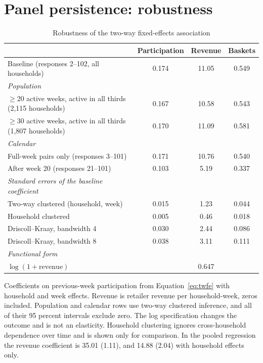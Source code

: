 \documentclass[11pt]{article}
\begin{document}
\clearpage
\appendix
\renewcommand{\thetable}{\thesection.\arabic{table}}
\renewcommand{\thefigure}{\thesection.\arabic{figure}}

\section{Panel persistence: robustness}
\label{app:panel}
\setcounter{table}{0}

\begin{table}[h]
\centering\small
\caption{Robustness of the two-way fixed-effects association}
\label{tab:panel-robust}
\begin{tabular}{@{}l S[table-format=1.3] S[table-format=2.3] S[table-format=1.3]@{}}
\toprule
 & {Participation} & {Revenue} & {Baskets} \\
\midrule
Baseline (responses 2--102, all households) & 0.174 & 11.05 & 0.549 \\
\addlinespace
\emph{Population} & & & \\
\quad $\ge$20 active weeks, active in all thirds (2,115 households) & 0.167 & 10.58 & 0.543 \\
\quad $\ge$30 active weeks, active in all thirds (1,807 households) & 0.170 & 11.09 & 0.581 \\
\addlinespace
\emph{Calendar} & & & \\
\quad Full-week pairs only (responses 3--101) & 0.171 & 10.76 & 0.540 \\
\quad After week 20 (responses 21--101) & 0.103 & 5.19 & 0.337 \\
\addlinespace
\emph{Standard errors of the baseline coefficient} & & & \\
\quad Two-way clustered (household, week) & 0.015 & 1.23 & 0.044 \\
\quad Household clustered & 0.005 & 0.46 & 0.018 \\
\quad Driscoll--Kraay, bandwidth 4 & 0.030 & 2.44 & 0.086 \\
\quad Driscoll--Kraay, bandwidth 8 & 0.038 & 3.11 & 0.111 \\
\addlinespace
\emph{Functional form} & & & \\
\quad $\log(1+\text{revenue})$ & & 0.647 & \\
\bottomrule
\end{tabular}

\smallskip
\parbox{0.94\textwidth}{\footnotesize Coefficients on previous-week participation from
Equation~\eqref{eq:twfe} with household and week effects. Revenue is retailer revenue per
household-week, zeros included. Population and calendar rows use two-way clustered inference, and all
of their 95 percent intervals exclude zero. The log specification changes the outcome and is not an
elasticity. Household clustering ignores cross-household dependence over time and is shown only for
comparison. In the pooled regression the revenue coefficient is 35.01 (1.11), and 14.88 (2.04) with
household effects only.}
\end{table}
\end{document}
